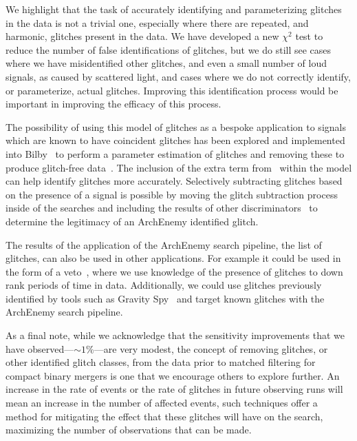 We highlight that the task of accurately identifying and parameterizing \scl{} glitches in the data is not a trivial one, especially where there are repeated, and harmonic, glitches present in the data. We have developed a new $\chi^{2}$ test to reduce the number of false identifications of \scl{} glitches, but we do still see cases where we have misidentified other glitches, and even a small number of loud \gw{} signals, as caused by scattered light, and cases where we do not correctly identify, or parameterize, actual \scl{} glitches. Improving this identification process would be important in improving the efficacy of this process.

The possibility of using this model of \scl{} glitches as a bespoke application to \gw{} signals which are known to have coincident \scl{} glitches has been explored and implemented into Bilby~\cite{Bilby} to perform a parameter estimation of \scl{} glitches and removing these to produce glitch-free data~\cite{Udall2022}. The inclusion of the extra term from~\cite{MichalSub} within the model can help identify \scl{} glitches more accurately. Selectively subtracting glitches based on the presence of a \gw{} signal is possible by moving the glitch subtraction process inside of the \gw{} searches and including the results of other \gw{} discriminators~\cite{rw_snr_eq, McIsaac_2022} to determine the legitimacy of an ArchEnemy identified glitch.

The results of the application of the ArchEnemy search pipeline, the list of \scl{} glitches, can also be used in other applications. For example it could be used in the form of a veto~\cite{DetCharO2O3}, where we use knowledge of the presence of \scl{} glitches to down rank periods of time in \gw{} data. Additionally, we could use \scl{} glitches previously identified by tools such as Gravity Spy~\cite{GSpy2022} and target known \scl{} glitches with the ArchEnemy search pipeline.

As a final note, while we acknowledge that the sensitivity improvements that we have observed---$\sim 1\%$---are very modest, the concept of removing \scl{} glitches, or other identified glitch classes, from the data prior to matched filtering for compact binary mergers is one that we encourage others to explore further. An increase in the rate of events or the rate of \scl{} glitches in future observing runs will mean an increase in the number of affected events, such techniques offer a method for mitigating the effect that these glitches will have on the search, maximizing the number of observations that can be made.
%
